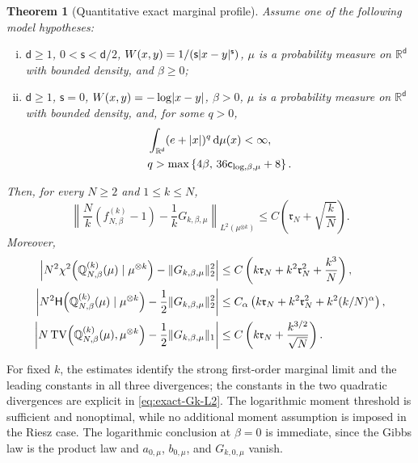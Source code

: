 \documentclass[11pt,reqno]{amsart}
\numberwithin{equation}{section}
\theoremstyle{plain}
\newtheorem{thm}{Theorem}[section]
\theoremstyle{remark}
\DeclarePairedDelimiter{\abs}{\lvert}{\rvert}
\DeclarePairedDelimiter{\norm}{\lVert}{\rVert}
\renewcommand{\d}{\mathsf{d}}
\newcommand{\md}{\mathrm{d}}
\newcommand{\R}{{\mathbb{R}}}
\newcommand{\Q}{{\mathbb{Q}}}
\newcommand{\Hr}{{\mathsf{H}}}
\newcommand{\be}{\beta}
\newcommand{\s}{\mathsf{s}}
\newcommand{\Chi}{\chi^2}
\newcommand{\TV}{\operatorname{TV}}
\begin{document}
\begin{thm}[Quantitative exact marginal profile]
\label{thm:quantitative-exact-marginal-profile}
Assume one of the following model hypotheses:
\begin{enumerate}[(i)]
\item $\d\geq1$, $0<\s<\d/2$, $W(x,y)=1/(\s\abs{x-y}^{\s})$, $\mu$ is a probability measure on $\R^\d$ with bounded density, and $\be\geq0$;
\item $\d\geq1$, $\s=0$, $W(x,y)=-\log\abs{x-y}$, $\be>0$, $\mu$ is a probability measure on $\R^\d$ with bounded density, and, for some $q>0$,
\begin{align}
 &\int_{\R^\d}(e+\abs{x})^q\,\md\mu(x)<\infty,
 \label{eq:exact-log-polynomial-moment}\\
 &q>\max\left\{4\be,\,36\mathsf c_{\log,\be,\mu}+8\right\}.
 \label{eq:exact-log-moment-threshold}
\end{align}
\end{enumerate}
Then, for every $N\geq2$ and $1\leq k\leq N$,
\begin{equation}\label{eq:quantitative-natural-profile}
 \left\|\frac Nk(f_{N,\be}^{(k)}-1)-\frac1kG_{k,\be,\mu}\right\|_{L^2(\mu^{\otimes k})}
 \leq C\left(\mathfrak r_N+\sqrt{\frac{k}{N}}\right).
\end{equation}
Moreover,
\begin{align}
 \left|N^2\Chi\!\left(\Q_{N,\be}^{(k)}(\mu)\mid\mu^{\otimes k}\right)-\norm{G_{k,\be,\mu}}_2^2\right|
 &\leq C\left(k\mathfrak r_N+k^2\mathfrak r_N^2+\frac{k^3}{N}\right),
 \label{eq:quantitative-uniform-chi}\\
 \left|N^2\Hr\!\left(\Q_{N,\be}^{(k)}(\mu)\mid\mu^{\otimes k}\right)-\frac12\norm{G_{k,\be,\mu}}_2^2\right|
 &\leq C_\alpha\left(k\mathfrak r_N+k^2\mathfrak r_N^2+k^2(k/N)^\alpha\right),
 \label{eq:quantitative-uniform-entropy}\\
 \left|N\TV\!\left(\Q_{N,\be}^{(k)}(\mu),\mu^{\otimes k}\right)-\frac12\norm{G_{k,\be,\mu}}_1\right|
 &\leq C\left(k\mathfrak r_N+\frac{k^{3/2}}{\sqrt N}\right).
 \label{eq:quantitative-uniform-TV}
\end{align}
\end{thm}

For fixed $k$, the estimates identify the strong first-order marginal limit and the leading constants in all three divergences; the constants in the two quadratic divergences are explicit in \eqref{eq:exact-Gk-L2}.  The logarithmic moment threshold is sufficient and nonoptimal, while no additional moment assumption is imposed in the Riesz case.
  The logarithmic conclusion at $\be=0$ is immediate, since the Gibbs law is the product law and $a_{0,\mu}$, $b_{0,\mu}$, and $G_{k,0,\mu}$ vanish.
\end{document}
